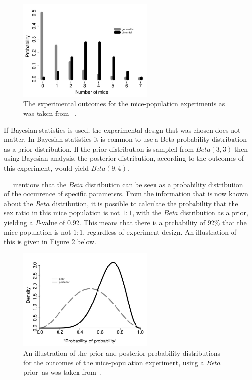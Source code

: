 \begin{figure}[htbp]
      \centering
      \includegraphics[width=0.6\textwidth]{images/mouse_experiment_outcome.pdf}
      \caption{The experimental outcomes for the mice-population experiments as was taken from~\cite{ref:hackenberger:2019} .}
      \label{fig:probability:bayesian_statistics:mouse_experiment_outcome}
\end{figure}

If Bayesian statistics is used, the experimental design that was chosen does not matter. In Bayesian statistics it is common to use a Beta probability distribution as a prior distribution. If the prior distribution is sampled from $Beta(3,3)$ then using Bayesian analysis, the posterior distribution, according to the outcomes of this experiment, would yield $Beta(9,4)$.

~\citeauthor{ref:hackenberger:2019}~\cite{ref:hackenberger:2019} mentions that the $Beta$ distribution can be seen as a probability distribution of the occurrence of specific parameters. From the information that is now known about the $Beta$ distribution, it is possible to calculate the probability that the sex ratio in this mice population is not $1:1$, with the $Beta$ distribution as a prior, yielding a $P$-value of $0.92$. This means that there is a probability of $92\%$ that the mice population is not $1:1$, regardless of experiment design. An illustration of this is given in Figure \ref{fig:probability:bayesian_statistics:mouse_distributions} below.

\begin{figure}[htbp]
      \centering
      \includegraphics[width=0.6\textwidth]{images/mouse_experiment_distributions.pdf}
      \caption{An illustration of the prior and posterior probability distributions for the outcomes of the mice-population experiment, using a $Beta$ prior, as was taken from~\cite{ref:hackenberger:2019}.}
      \label{fig:probability:bayesian_statistics:mouse_distributions}
\end{figure}

